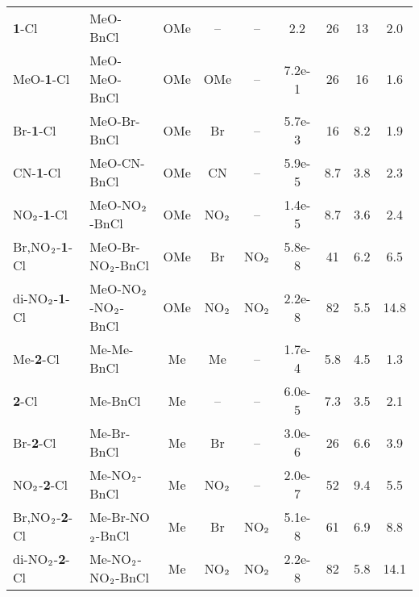\begin{table*}[h!]
\begin{tabular}{l l c c c S S S S}
\midrule
\textbf{1}-Cl                 &  MeO-BnCl                         &  OMe          &   --            &  --           &      2.2       &   26    &   13    &   2.0 \\
MeO-\textbf{1}-Cl             &   MeO-MeO-BnCl                    &  OMe          &  OMe            &  --           &      7.2e-1    &   26    &   16    &   1.6 \\
Br-\textbf{1}-Cl              &   MeO-Br-BnCl                     &  OMe          &  Br             &  --           &      5.7e-3    &   16    &   8.2   &   1.9 \\
CN-\textbf{1}-Cl              &   MeO-CN-BnCl                     &  OMe          &  CN             &  --           &      5.9e-5    &   8.7   &   3.8   &   2.3 \\
NO$\rm _2$-\textbf{1}-Cl      &   MeO-NO$\rm _2$-BnCl             &  OMe          &  NO$\rm _2$     &  --           &      1.4e-5    &   8.7   &   3.6   &   2.4 \\
Br,NO$\rm _2$-\textbf{1}-Cl   &   MeO-Br-NO$\rm _2$-BnCl          &  OMe          &  Br             &  NO$\rm _2$   &      5.8e-8    &   41    &   6.2   &   6.5 \\
di-NO$\rm _2$-\textbf{1}-Cl   &   MeO-NO$\rm _2$-NO$\rm _2$-BnCl  &  OMe          &  NO$\rm _2$     &  NO$\rm _2$   &      2.2e-8    &   82    &   5.5   &   14.8 \\
\noalign{\medskip}
Me-\textbf{2}-Cl              &   Me-Me-BnCl                      &  Me           &  Me             &  --           &      1.7e-4    &   5.8   &   4.5   &   1.3 \\
\textbf{2}-Cl                 &   Me-BnCl                         &  Me           &   --            &  --           &      6.0e-5    &   7.3   &   3.5   &   2.1 \\
Br-\textbf{2}-Cl              &   Me-Br-BnCl                      &  Me           &  Br             &  --           &      3.0e-6    &   26    &   6.6   &   3.9 \\
NO$\rm _2$-\textbf{2}-Cl      &   Me-NO$\rm _2$-BnCl              &  Me           &  NO$\rm _2$     &  --           &      2.0e-7    &   52    &   9.4   &   5.5 \\
Br,NO$\rm _2$-\textbf{2}-Cl   &   Me-Br-NO$\rm _2$-BnCl           &  Me           &  Br             &  NO$\rm _2$   &      5.1e-8    &   61    &   6.9   &   8.8 \\
di-NO$\rm _2$-\textbf{2}-Cl   &   Me-NO$\rm _2$-NO$\rm _2$-BnCl   &  Me           &  NO$\rm _2$     &  NO$\rm _2$   &      2.2e-8    &   82    &   5.8   &   14.1 \\

\end{tabular}
\end{table*}
